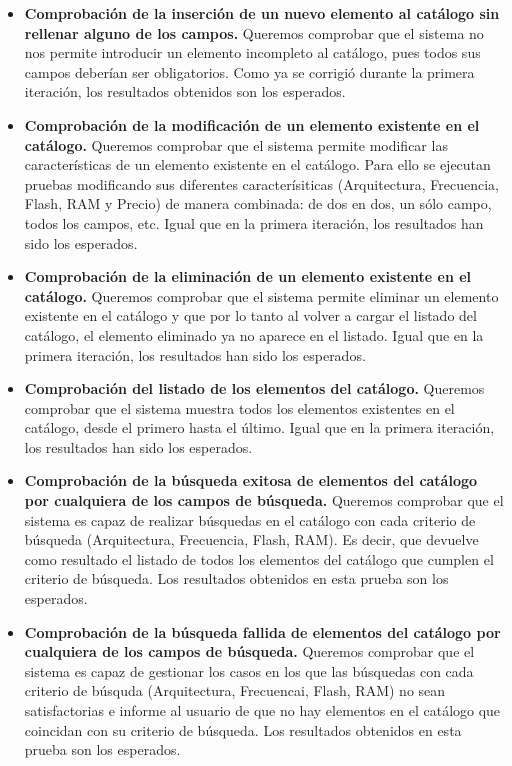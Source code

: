 \begin{itemize}
\begin{itemize}
	\item \textbf{Comprobación de la inserción de un nuevo elemento al catálogo sin rellenar alguno de los campos.} Queremos comprobar que el sistema no nos permite introducir un elemento incompleto al catálogo, pues todos sus campos deberían ser obligatorios. Como ya se corrigió durante la primera iteración, los resultados obtenidos son los esperados. 	

	\item \textbf{Comprobación de la modificación de un elemento existente en el catálogo.} Queremos comprobar que el sistema permite modificar las características de un elemento existente en el catálogo. Para ello se ejecutan pruebas modificando sus diferentes caracterísiticas (Arquitectura, Frecuencia, Flash, RAM y Precio) de manera combinada: de dos en dos, un sólo campo, todos los campos, etc. Igual que en la primera iteración, los resultados han sido los esperados.
	
	\item \textbf{Comprobación de la eliminación de un elemento existente en el catálogo.} Queremos comprobar que el sistema permite eliminar un elemento existente en el catálogo y que por lo tanto al volver a cargar el listado del catálogo, el elemento eliminado ya no aparece en el listado. Igual que en la primera iteración, los resultados han sido los esperados.
	
	\item \textbf{Comprobación del listado de los elementos del catálogo.} Queremos comprobar que el sistema muestra todos los elementos existentes en el catálogo, desde el primero hasta el último. Igual que en la primera iteración, los resultados han sido los esperados.
	
	\item \vspace{0.5in} \textbf{Comprobación de la búsqueda exitosa de elementos del catálogo por cualquiera de los campos de búsqueda.} Queremos comprobar que el sistema es capaz de realizar búsquedas en el catálogo con cada criterio de búsqueda (Arquitectura, Frecuencia, Flash, RAM). Es decir, que devuelve como resultado el listado de todos los elementos del catálogo que cumplen el criterio de búsqueda. Los resultados obtenidos en esta prueba son los esperados.
		
	\item \textbf{Comprobación de la búsqueda fallida de elementos del catálogo por cualquiera de los campos de búsqueda.} Queremos comprobar que el sistema es capaz de gestionar los casos en los que las búsquedas con cada criterio de búsquda (Arquitectura, Frecuencai, Flash, RAM) no sean satisfactorias e informe al usuario de que no hay elementos en el catálogo que coincidan con su criterio de búsqueda. Los resultados obtenidos en esta prueba son los esperados.
	\end{itemize}


\end{itemize}
